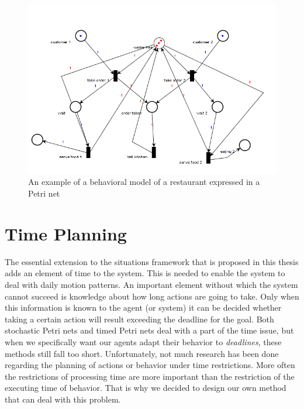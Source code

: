 \documentclass[11pt, a4paper]{book}
\begin{document}
\begin{figure}
\begin{center}
\includegraphics[width=450pt]{restaurant.png}
\end{center}
\caption{An example of a behavioral model of a restaurant expressed in a Petri net}
\label{fig:restaurantnet}
\end{figure}

\section{Time Planning}
The essential extension to the situations framework that is proposed in this thesis adds an element of time to the system. This is needed to enable the system to deal with daily motion patterns. An important element without which the system cannot succeed is knowledge about how long actions are going to take. Only when this information is known to the agent (or system) it can be decided whether taking a certain action will result exceeding the deadline for the goal. Both stochastic Petri nets and timed Petri nets deal with a part of the time issue, but when we specifically want our agents adapt their behavior to \emph{deadlines}, these methods still fall too short. Unfortunately, not much research has been done regarding the planning of actions or behavior under time restrictions. More often the restrictions of processing time are more important than the restriction of the executing time of behavior. That is why we decided to design our own method that can deal with this problem.
\end{document}
